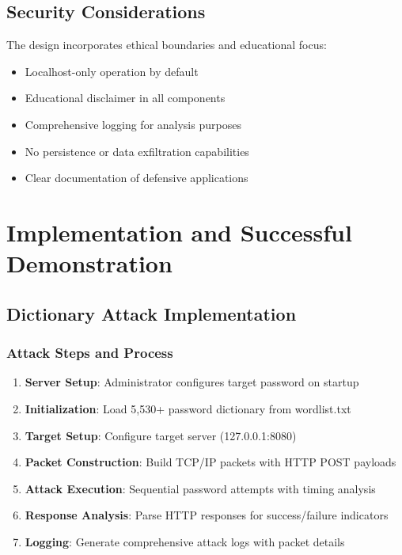 \documentclass[12pt,a4paper]{article}
\begin{document}
\subsection{Security Considerations}

The design incorporates ethical boundaries and educational focus:

\begin{itemize}
    \item Localhost-only operation by default
    \item Educational disclaimer in all components
    \item Comprehensive logging for analysis purposes
    \item No persistence or data exfiltration capabilities
    \item Clear documentation of defensive applications
\end{itemize}

\section{Implementation and Successful Demonstration}

\subsection{Dictionary Attack Implementation}

\subsubsection{Attack Steps and Process}

\begin{enumerate}
    \item \textbf{Server Setup}: Administrator configures target password on startup
    \item \textbf{Initialization}: Load 5,530+ password dictionary from wordlist.txt
    \item \textbf{Target Setup}: Configure target server (127.0.0.1:8080)
    \item \textbf{Packet Construction}: Build TCP/IP packets with HTTP POST payloads
    \item \textbf{Attack Execution}: Sequential password attempts with timing analysis
    \item \textbf{Response Analysis}: Parse HTTP responses for success/failure indicators
    \item \textbf{Logging}: Generate comprehensive attack logs with packet details
\end{enumerate}
\end{document}
